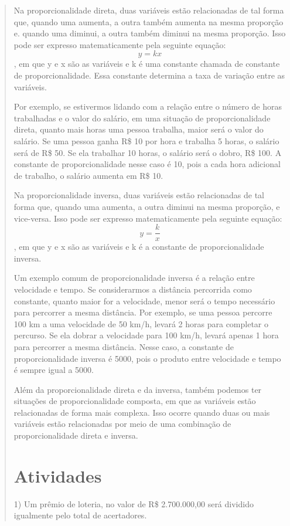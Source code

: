 \begin{quote}
\begin{escolha}
{Na proporcionalidade direta, duas variáveis estão relacionadas de tal forma que, quando uma aumenta, a outra 
também aumenta na mesma proporção e. quando uma diminui, a outra também diminui na mesma proporção. Isso pode 
ser expresso matematicamente pela seguinte equação: $$y=kx$$, em que y e x são as variáveis e
k é uma constante chamada de constante de proporcionalidade. Essa constante determina a taxa de variação 
entre as variáveis.

Por exemplo, se estivermos lidando com a relação entre o número de horas trabalhadas e o valor do salário, em 
uma situação de proporcionalidade direta, quanto mais horas uma pessoa trabalha, maior será o valor do 
salário. Se uma pessoa ganha R\$ 10 por hora e trabalha 5 horas, o salário será de R\$ 50. Se ela trabalhar 
10 horas, o salário será o dobro, R\$ 100. A constante de proporcionalidade nesse caso é 10, pois a cada hora 
adicional de trabalho, o salário aumenta em R\$ 10.

Na proporcionalidade inversa, duas variáveis estão relacionadas de tal forma que, quando uma aumenta, a outra 
diminui na mesma proporção, e vice-versa. Isso pode ser expresso matematicamente pela seguinte equação: 
$$y=\frac{k}{x}$$, em que y e x são as variáveis e k é a constante de proporcionalidade inversa.

Um exemplo comum de proporcionalidade inversa é a relação entre velocidade e tempo. Se considerarmos a 
distância percorrida como constante, quanto maior for a velocidade, menor será o tempo necessário para 
percorrer a mesma distância. Por exemplo, se uma pessoa percorre 100 km a uma velocidade de 50 km/h, levará 2 
horas para completar o percurso. Se ela dobrar a velocidade para 100 km/h, levará apenas 1 hora para 
percorrer a mesma distância. Nesse caso, a constante de proporcionalidade inversa é 5000, pois o produto 
entre velocidade e tempo é sempre igual a 5000.

Além da proporcionalidade direta e da inversa, também podemos ter situações de proporcionalidade composta, 
em que as variáveis estão relacionadas de forma mais complexa. Isso ocorre quando duas ou mais variáveis 
estão relacionadas por meio de uma combinação de proporcionalidade direta e inversa.}

\section{Atividades}

1) Um prêmio de loteria, no valor de R\$ 2.700.000,00 será dividido
igualmente pelo total de acertadores.


\end{escolha}
\end{quote}
